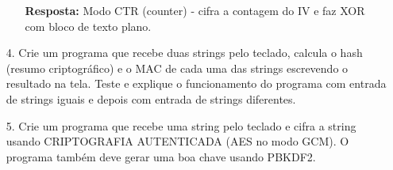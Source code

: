 \documentclass[12pt,a4paper]{article}
\begin{document}
\begin{enumerate}
\begin{enumerate}
						\textbf{Resposta:} Modo CTR (counter) - cifra a contagem do IV e faz XOR com bloco de texto plano.
				\end{enumerate}
			
			\item[4.] Crie um programa que recebe duas strings pelo teclado, calcula o hash (resumo criptográfico) e o MAC de cada uma das strings escrevendo o resultado na tela. Teste e explique o funcionamento do programa com entrada de strings iguais e depois com entrada de strings diferentes.
			
			\item[5.] Crie um programa que recebe uma string pelo teclado e cifra a string usando CRIPTOGRAFIA AUTENTICADA (AES no modo GCM). O programa também deve gerar uma boa chave usando PBKDF2.
		\end{enumerate}	
\end{document}
